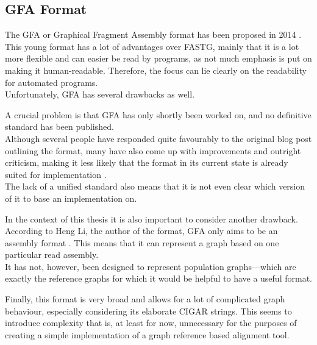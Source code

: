 \documentclass[a4paper,12pt,twoside,BCOR=10mm]{scrbook}
\begin{document}
\subsection{GFA Format}

The GFA or Graphical Fragment Assembly format 
has been proposed in 2014 \citep{specGFA1,specGFA2}. 
This young format has a lot of advantages over FASTG, mainly 
that it is a lot more flexible and can easier be read by programs, 
as not much emphasis is put on making it human-readable. Therefore, 
the focus can lie clearly on the readability for automated programs. \\
Unfortunately, GFA has several drawbacks as well.

A crucial problem is that GFA has only shortly been worked on, 
and no definitive standard has been published. \\
Although several people have responded quite favourably to the original blog post 
outlining the format, many have also come up with improvements and outright criticism, 
making it less likely that the format in its current state 
is already suited for implementation \citep{knightGFA1}. \\
The lack of a unified standard also means that it is not even clear which version of it 
to base an implementation on.

In the context of this thesis it is also important to consider another drawback. 
According to Heng Li, the author of the format, GFA only aims to be an assembly format \citep{specGFA3}.
This means that it can represent a graph based on one particular read assembly. \\
It has not, however, been designed to represent population graphs---which are exactly 
the reference graphs for which it would be helpful to have a useful format.

Finally, this format is very broad and allows for a lot of complicated 
graph behaviour, especially considering its elaborate CIGAR strings. 
This seems to introduce complexity that is, at least for now, 
unnecessary for the purposes of creating a simple 
implementation of a graph reference based alignment tool.
\end{document}
